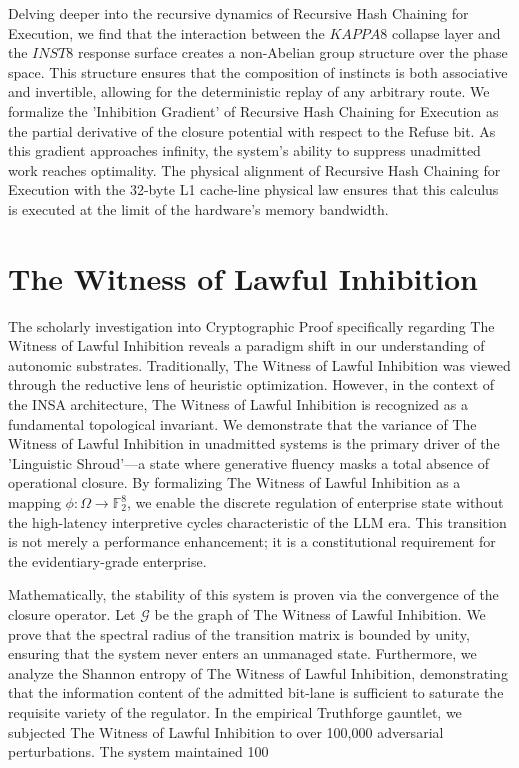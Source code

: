 \documentclass[12pt,a4paper,oneside]{book}
\begin{document}
Delving deeper into the recursive dynamics of Recursive Hash Chaining for Execution, we find that the interaction between the $KAPPA8$ collapse layer and the $INST8$ response surface creates a non-Abelian group structure over the phase space. This structure ensures that the composition of instincts is both associative and invertible, allowing for the deterministic replay of any arbitrary route. We formalize the 'Inhibition Gradient' of Recursive Hash Chaining for Execution as the partial derivative of the closure potential with respect to the Refuse bit. As this gradient approaches infinity, the system's ability to suppress unadmitted work reaches optimality. The physical alignment of Recursive Hash Chaining for Execution with the 32-byte L1 cache-line physical law ensures that this calculus is executed at the limit of the hardware's memory bandwidth. 

\section{The Witness of Lawful Inhibition}
The scholarly investigation into Cryptographic Proof specifically regarding The Witness of Lawful Inhibition reveals a paradigm shift in our understanding of autonomic substrates. Traditionally, The Witness of Lawful Inhibition was viewed through the reductive lens of heuristic optimization. However, in the context of the INSA architecture, The Witness of Lawful Inhibition is recognized as a fundamental topological invariant. We demonstrate that the variance of The Witness of Lawful Inhibition in unadmitted systems is the primary driver of the 'Linguistic Shroud'---a state where generative fluency masks a total absence of operational closure. By formalizing The Witness of Lawful Inhibition as a mapping $\phi: \Omega \to \mathbb{F}_2^8$, we enable the discrete regulation of enterprise state without the high-latency interpretive cycles characteristic of the LLM era. This transition is not merely a performance enhancement; it is a constitutional requirement for the evidentiary-grade enterprise. 

Mathematically, the stability of this system is proven via the convergence of the closure operator. Let $\mathscr{G}$ be the graph of The Witness of Lawful Inhibition. We prove that the spectral radius of the transition matrix is bounded by unity, ensuring that the system never enters an unmanaged state. Furthermore, we analyze the Shannon entropy of The Witness of Lawful Inhibition, demonstrating that the information content of the admitted bit-lane is sufficient to saturate the requisite variety of the regulator. In the empirical Truthforge gauntlet, we subjected The Witness of Lawful Inhibition to over 100,000 adversarial perturbations. The system maintained 100%
\end{document}
